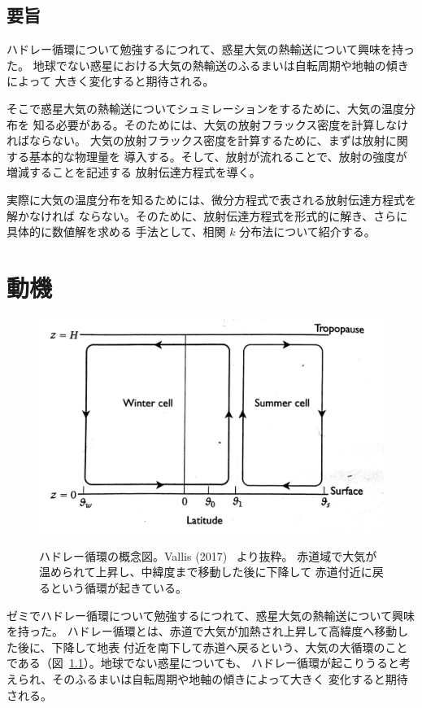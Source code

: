 \documentclass[book]{dennou777}
\renewcommand{\maketitle}{\epmaketitle}
\begin{document}
\begin{titlepage}
	\maketitle
\end{titlepage}

\cleardoublepage

\rule{0pt}{0pt}\vfill
\section*{要旨}
\begin{figure}
\end{figure}
ハドレー循環について勉強するにつれて、惑星大気の熱輸送について興味を持った。
地球でない惑星における大気の熱輸送のふるまいは自転周期や地軸の傾きによって
大きく変化すると期待される。

そこで惑星大気の熱輸送についてシュミレーションをするために、大気の温度分布を
知る必要がある。そのためには、大気の放射フラックス密度を計算しなければならない。
大気の放射フラックス密度を計算するために、まずは放射に関する基本的な物理量を
導入する。そして、放射が流れることで、放射の強度が増減することを記述する
放射伝達方程式を導く。

実際に大気の温度分布を知るためには、微分方程式で表される放射伝達方程式を解かなければ
ならない。そのために、放射伝達方程式を形式的に解き、さらに具体的に数値解を求める
手法として、相関 \(k\) 分布法について紹介する。
\vfill\rule{0pt}{0pt}

\pagebreak

\tableofcontents
\pagebreak

\chapter{動機}

\begin{figure}[t]
	\centering\label{hadley}
	\includegraphics[width=.7\textwidth]{hadley.jpg}
	\caption[ハドレー循環の概念図]{
		ハドレー循環の概念図。Vallis (2017)~\cite{vallis} より抜粋。
		赤道域で大気が温められて上昇し、中緯度まで移動した後に下降して
		赤道付近に戻るという循環が起きている。
	}
\end{figure}
ゼミでハドレー循環について勉強するにつれて、惑星大気の熱輸送について興味を持った。
ハドレー循環とは、赤道で大気が加熱され上昇して高緯度へ移動した後に、下降して地表
付近を南下して赤道へ戻るという、大気の大循環のことである（図~\ref{hadley}）。地球でない惑星についても、
ハドレー循環が起こりうると考えられ、そのふるまいは自転周期や地軸の傾きによって大きく
変化すると期待される。
\end{document}
